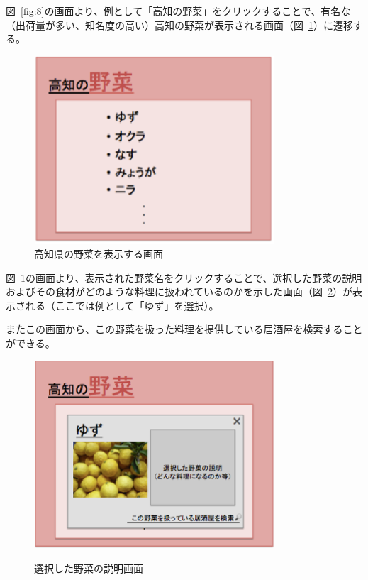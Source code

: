 \documentclass[a4j,titlepage]{jarticle}
\begin{document}
図~\ref{fig:8}の画面より、例として「高知の野菜」をクリックすることで、有名な（出荷量が多い、知名度の高い）高知の野菜が表示される画面（図~\ref{fig:9}）に遷移する。
\clearpage
\begin {figure}[!htbp]
    \begin{center}
    \includegraphics [height=7cm, width=9cm]{9.eps}
    \caption {高知県の野菜を表示する画面}
    \label {fig:9}
    \end{center}
\end {figure}



図~\ref{fig:9}の画面より、表示された野菜名をクリックすることで、選択した野菜の説明およびその食材がどのような料理に扱われているのかを示した画面（図~\ref{fig:10}）が表示される（ここでは例として「ゆず」を選択）。



またこの画面から、この野菜を扱った料理を提供している居酒屋を検索することができる。




\begin {figure}[!htbp]
    \begin{center}
    \includegraphics [height=7cm, width=9cm]{10.eps}
　　    \caption {選択した野菜の説明画面}
    \label {fig:10}
    \end{center}
\end {figure}
\end{document}
